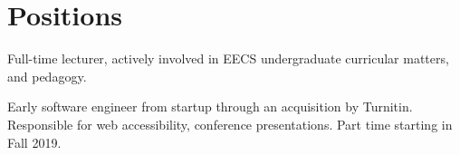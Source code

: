 \section{Positions}

\vspace{6pt}

{\vspace{4pt} Full-time lecturer, actively involved in EECS undergraduate curricular matters, and pedagogy.}

\vspace{6pt}

{\vspace{4pt}Early software engineer from startup through an acquisition by Turnitin. Responsible for web accessibility, conference presentations. Part time starting in Fall 2019.}
    
\vspace{6pt}
    

    
    
   
